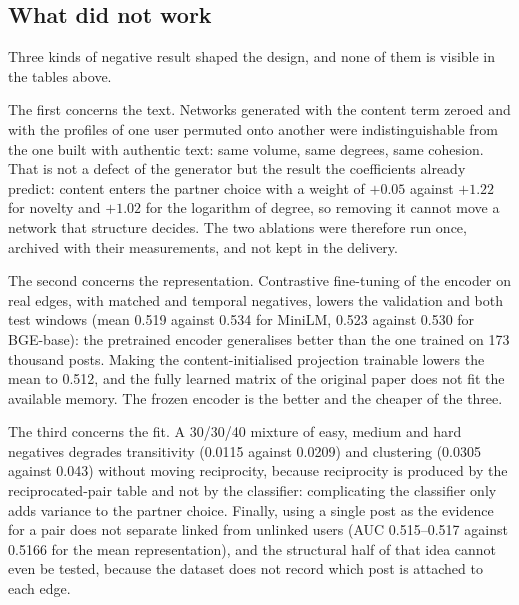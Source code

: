 \documentclass[11pt,a4paper]{article}
\begin{document}
\subsection{What did not work}

Three kinds of negative result shaped the design, and none of them is visible in the tables above.

The first concerns the text. Networks generated with the content term zeroed and with the profiles of one
user permuted onto another were indistinguishable from the one built with authentic text: same volume, same
degrees, same cohesion. That is not a defect of the generator but the result the coefficients already
predict: content enters the partner choice with a weight of $+0.05$ against $+1.22$ for novelty and
$+1.02$ for the logarithm of degree, so removing it cannot move a network that structure decides. The two
ablations were therefore run once, archived with their measurements, and not kept in the delivery.

The second concerns the representation. Contrastive fine-tuning of the encoder on real edges, with matched
and temporal negatives, lowers the validation and both test windows (mean 0.519 against 0.534 for MiniLM,
0.523 against 0.530 for BGE-base): the pretrained encoder generalises better than the one trained on 173
thousand posts. Making the content-initialised projection trainable lowers the mean to 0.512, and the fully
learned matrix of the original paper does not fit the available memory. The frozen encoder is the better and
the cheaper of the three.

The third concerns the fit. A 30/30/40 mixture of easy, medium and hard negatives degrades transitivity
(0.0115 against 0.0209) and clustering (0.0305 against 0.043) without moving reciprocity, because
reciprocity is produced by the reciprocated-pair table and not by the classifier: complicating the classifier
only adds variance to the partner choice. Finally, using a single post as the evidence for a pair does not
separate linked from unlinked users (AUC 0.515--0.517 against 0.5166 for the mean representation), and the
structural half of that idea cannot even be tested, because the dataset does not record which post is
attached to each edge.
\end{document}
